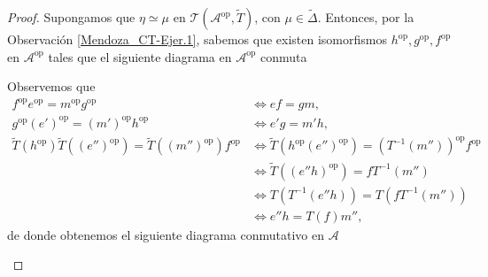 \documentclass[tesis]{subfiles}
\begin{document}
\begin{proof}
    Supongamos que $\eta\simeq\mu$ en $\mathscr{T}(\mathscr{A}^\text{op},\tilde{T})$, con $\mu\in\tilde{\Delta}$. Entonces, por la Observación \ref{Mendoza_CT-Ejer.1}, sabemos que existen isomorfismos $h^\text{op},g^\text{op},f^\text{op}$ en $\mathscr{A}^\text{op}$ tales que el siguiente diagrama en $\mathscr{A}^\text{op}$ conmuta
    \begin{center}
    \end{center}
    Observemos que
    \begin{align*}
        f^\text{op}e^\text{op} = m^\text{op}g^\text{op} &\iff ef = gm, \\
            g^\text{op}(e')^\text{op} = (m')^\text{op}h^\text{op} &\iff e'g = m'h, \\
                \tilde{T}(h^\text{op})\tilde{T}((e'')^\text{op}) = \tilde{T}((m'')^\text{op})f^\text{op} &\iff \tilde{T}(h^\text{op}(e'')^\text{op}) = (T^{-1}(m''))^\text{op}f^\text{op} \\
                                                                                                         &\iff \tilde{T}((e''h)^\text{op}) = fT^{-1}(m'') \\
                                                                                                         &\iff T(T^{-1}(e''h)) = T(fT^{-1}(m'')) \\
                                                                                                         &\iff e''h = T(f)m'',
    \end{align*}
    de donde obtenemos el siguiente diagrama conmutativo en $\mathscr{A}$
    \begin{center}
\end{center}
\end{proof}
\end{document}
